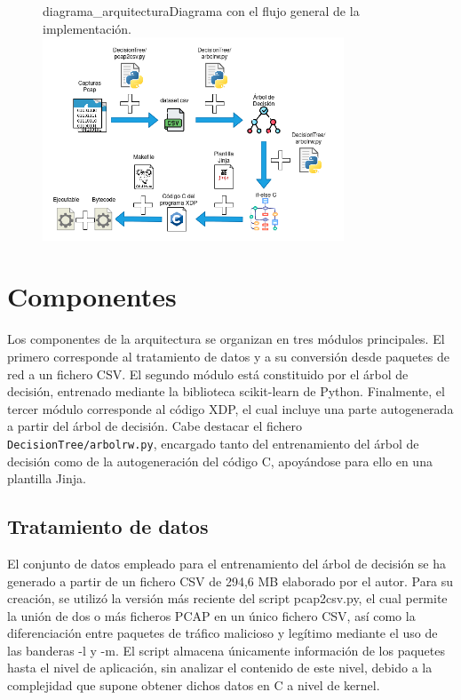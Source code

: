 \begin{figure}[Arquitectura Implementación]{diagrama_arquitectura}{Diagrama con el flujo general de la implementación.}
	\includegraphics[width=0.8\textwidth]{capturas/Arquitectura_implementacion.png}
\end{figure}

\section{Componentes}

Los componentes de la arquitectura se organizan en tres módulos principales. El primero corresponde al tratamiento de datos y a su conversión desde paquetes de red a un fichero CSV. El segundo módulo está constituido por el árbol de decisión, entrenado mediante la biblioteca scikit-learn de Python. Finalmente, el tercer módulo corresponde al código XDP, el cual incluye una parte autogenerada a partir del árbol de decisión. Cabe destacar el fichero \verb|DecisionTree/arbolrw.py|, encargado tanto del entrenamiento del árbol de decisión como de la autogeneración del código C, apoyándose para ello en una plantilla Jinja.

\subsection{Tratamiento de datos}

El conjunto de datos empleado para el entrenamiento del árbol de decisión se ha generado a partir de un fichero CSV de 294,6 MB elaborado por el autor. Para su creación, se utilizó la versión más reciente del script pcap2csv.py, el cual permite la unión de dos o más ficheros PCAP en un único fichero CSV, así como la diferenciación entre paquetes de tráfico malicioso y legítimo mediante el uso de las banderas -l y -m. El script almacena únicamente información de los paquetes hasta el nivel de aplicación, sin analizar el contenido de este nivel, debido a la complejidad que supone obtener dichos datos en C a nivel de kernel.

